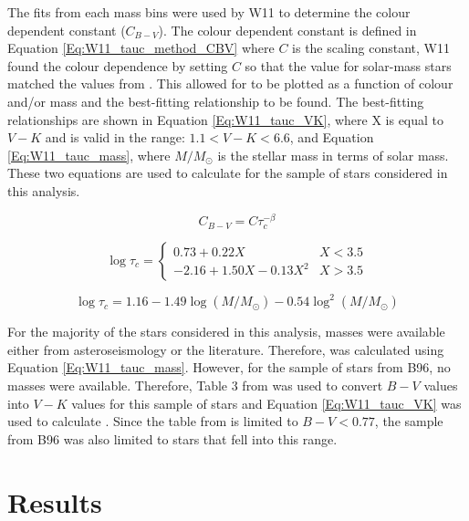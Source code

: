 The fits from each mass bins were used by W11 to determine the colour dependent constant ($C_{B-V}$). The colour dependent constant is defined in Equation \ref{Eq:W11_tauc_method_CBV} where $C$ is the scaling constant, W11 found the colour dependence by setting $C$ so that the \tauc value for solar-mass stars matched the values from \citet{Noyes_etal_1984}. This allowed for \tauc to be plotted as a function of colour and/or mass and the best-fitting relationship to be found. The best-fitting relationships are shown in Equation \ref{Eq:W11_tauc_VK}, where X is equal to $V-K$ and is valid in the range: $1.1 < V-K < 6.6$, and Equation \ref{Eq:W11_tauc_mass}, where $M/M_{\odot}$ is the stellar mass in terms of solar mass. These two equations are used to calculate \tauc for the sample of stars considered in this analysis.

\begin{equation}
    C_{B-V} = C\tau_{c}^{-\beta}
    \label{Eq:W11_tauc_method_CBV}
\end{equation}

\begin{equation}
    \log \tau_{c} = 
    \begin{cases}
        0.73 + 0.22X & X < 3.5 \\
        -2.16 +1.50X - 0.13X^{2} & X > 3.5
    \end{cases}
    \label{Eq:W11_tauc_VK}
\end{equation}

\begin{equation}
    \log \tau_{c} = 1.16 - 1.49\log(M/M_{\odot}) - 0.54\log^{2}(M/M_{\odot})
    \label{Eq:W11_tauc_mass}
\end{equation}

For the majority of the stars considered in this analysis, masses were available either from asteroseismology or the literature. Therefore, \tauc was calculated using Equation \ref{Eq:W11_tauc_mass}. However, for the sample of stars from B96, no masses were available. Therefore, Table 3 from \citet{Pecaut_etal_2012} was used to convert $B-V$ values into $V-K$ values for this sample of stars and Equation \ref{Eq:W11_tauc_VK} was used to calculate \tauc. Since the table from \citet{Pecaut_etal_2012} is limited to $B-V < 0.77$, the sample from B96 was also limited to stars that fell into this range.

\section{Results}

